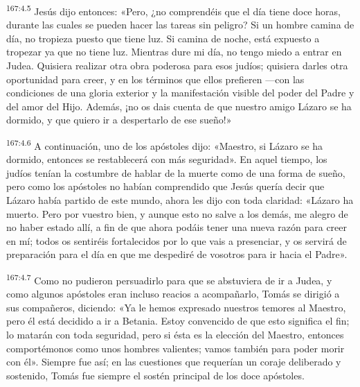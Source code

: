 \par 
\textsuperscript{167:4.5} Jesús dijo entonces: «Pero, ¿no comprendéis que el día tiene doce horas, durante las cuales se pueden hacer las tareas sin peligro? Si un hombre camina de día, no tropieza puesto que tiene luz. Si camina de noche, está expuesto a tropezar ya que no tiene luz. Mientras dure mi día, no tengo miedo a entrar en Judea. Quisiera realizar otra obra poderosa para esos judíos; quisiera darles otra oportunidad para creer, y en los términos que ellos prefieren ---con las condiciones de una gloria exterior y la manifestación visible del poder del Padre y del amor del Hijo. Además, ¡no os dais cuenta de que nuestro amigo Lázaro se ha dormido, y que quiero ir a despertarlo de ese sueño!»

\par 
\textsuperscript{167:4.6} A continuación, uno de los apóstoles dijo: «Maestro, si Lázaro se ha dormido, entonces se restablecerá con más seguridad». En aquel tiempo, los judíos tenían la costumbre de hablar de la muerte como de una forma de sueño, pero como los apóstoles no habían comprendido que Jesús quería decir que Lázaro había partido de este mundo, ahora les dijo con toda claridad: «Lázaro ha muerto. Pero por vuestro bien, y aunque esto no salve a los demás, me alegro de no haber estado allí, a fin de que ahora podáis tener una nueva razón para creer en mí; todos os sentiréis fortalecidos por lo que vais a presenciar, y os servirá de preparación para el día en que me despediré de vosotros para ir hacia el Padre».

\par 
\textsuperscript{167:4.7} Como no pudieron persuadirlo para que se abstuviera de ir a Judea, y como algunos apóstoles eran incluso reacios a acompañarlo, Tomás se dirigió a sus compañeros, diciendo: «Ya le hemos expresado nuestros temores al Maestro, pero él está decidido a ir a Betania. Estoy convencido de que esto significa el fin; lo matarán con toda seguridad, pero si ésta es la elección del Maestro, entonces comportémonos como unos hombres valientes; vamos también para poder morir con él». Siempre fue así; en las cuestiones que requerían un coraje deliberado y sostenido, Tomás fue siempre el sostén principal de los doce apóstoles.


